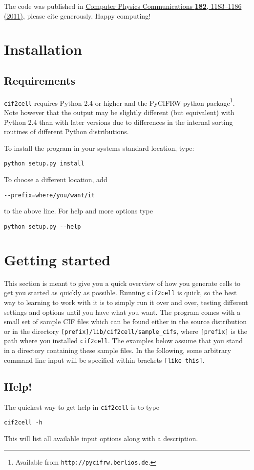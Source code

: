\documentclass[11pt]{article}
\newcommand{\ciftocell}{\texttt{cif2cell}}
\begin{document}
The code was published in \href{http://dx.doi.org/10.1016/j.cpc.2011.01.013}{Computer Physics Communications {\bf 182}, 1183--1186 (2011)}, please cite generously. Happy computing!

\newpage
\section{Installation}
\subsection{Requirements}
\ciftocell{} requires Python 2.4 or higher and the PyCIFRW python package\footnote{Available from \texttt{http://pycifrw.berlios.de}.}. Note however that the output may be slightly different (but equivalent) with Python 2.4 than with later versions due to differences in the internal sorting routines of different Python distributions.

To install the program in your systems standard location, type:
\begin{verbatim}
python setup.py install 
\end{verbatim}
To choose a different location, add 
\begin{verbatim}
--prefix=where/you/want/it 
\end{verbatim}
to the above line. For help and more options type
\begin{verbatim}
python setup.py --help
\end{verbatim}


\section{Getting started}

This section is meant to give you a quick overview of how you generate cells to get you started as quickly as possible. Running \ciftocell{} is quick, so the best way to learning to work with it is to simply run it over and over, testing different settings and options until you have what you want. The program comes with a small set of sample CIF files which can be found either in the source distribution or in the directory \texttt{[prefix]/lib/cif2cell/sample\_cifs}, where \texttt{[prefix]} is the path where you installed \ciftocell. The examples below assume that you stand in a directory containing these sample files. In the following, some arbitrary command line input will be specified within brackets \texttt{[like this]}. 

\subsection{Help!}
The quickest way to get help in \ciftocell{} is to type
\begin{verbatim}
cif2cell -h
\end{verbatim}
This will list all available input options along with a description.
\end{document}
